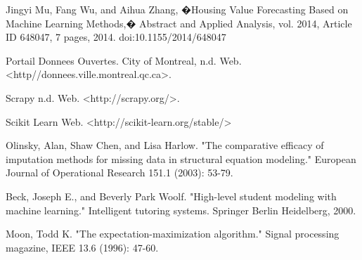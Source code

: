 \documentclass{acm_proc_article-sp}
\begin{document}
\begin{thebibliography}{9}

  Jingyi Mu, Fang Wu, and Aihua Zhang, �Housing Value Forecasting Based on Machine Learning Methods,� Abstract and Applied Analysis, vol. 2014, Article ID 648047, 7 pages, 2014. doi:10.1155/2014/648047
  
	Portail Donnees Ouvertes. City of Montreal, n.d. Web. <http//donnees.ville.montreal.qc.ca>.
	
	Scrapy n.d. Web. <http://scrapy.org/>.
	
 	Scikit Learn Web. <http://scikit-learn.org/stable/>
 	
Olinsky, Alan, Shaw Chen, and Lisa Harlow. "The comparative efficacy of imputation methods for missing data in structural equation modeling." European Journal of Operational Research 151.1 (2003): 53-79.

Beck, Joseph E., and Beverly Park Woolf. "High-level student modeling with machine learning." Intelligent tutoring systems. Springer Berlin Heidelberg, 2000.

Moon, Todd K. "The expectation-maximization algorithm." Signal processing magazine, IEEE 13.6 (1996): 47-60.
\end{thebibliography}
\end{document}
